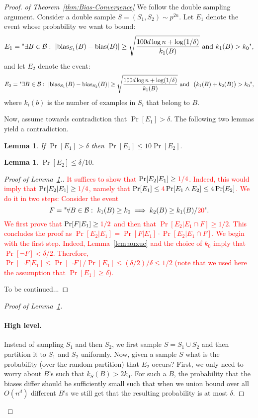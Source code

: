 \documentclass{article}
\newtheorem{lemma}[theorem]{Lemma}
\newcommand{\B}{{\cal B}}
\newcommand{\bias}{\text{bias}}
\newcommand{\samp}{S}
\newcommand{\new}[1]{\textcolor{red}{#1}}
\begin{document}
\begin{proof} {\em of Theorem~\ref{thm:Bias-Convergence}} \newline
We follow the double sampling argument.
Consider a double sample $S=(\samp_1,\samp_2)\sim p^{2n}$.
Let $E_1$ denote the event whose probability we want to bound:
\[
E_1 = \text{"}\exists {B\in\B}:~\lvert \bias_{\samp_1}(B) -
\bias(B)\rvert \geq \sqrt{\frac{100d\log n + \log(1/\delta)}{k_1(B)}}
\mbox{ and } k_1(B)>k_0
\text{"}, 
\]
and let $E_2$ denote the event:
\[
E_2 = \text{"}\exists {B\in\B}:~\lvert \bias_{\samp_1}(B) -  \bias_{\samp_2}(B)\rvert \geq \sqrt{\frac{100d\log n + \log(1/\delta)}{k_1(B)}}
  \mbox{ and }~ \bigl(k_1(B) + k_2(B)\bigr)>k_0
  \text{"},
\]
where $k_i(b)$ is the number of examples in $S_i$ that belong to $B$.

Now, assume towards contradiction that $\Pr[E_1] > \delta$.
The following two lemmas yield a contradiction.
\begin{lemma}\label{lem:aux1}
If $\Pr[E_1] > \delta$ then $\Pr[E_1]\leq 10\Pr[E_2].$
\end{lemma}
\begin{lemma}\label{lem:aux2}
$\Pr[E_2]\leq \delta/10.$
\end{lemma}

\begin{proof}[Proof of Lemma~\ref{lem:aux1}.]

\new{It suffices to show that $\Pr[E_2 \vert E_1]\geq \new{1/4}$.
Indeed, this would imply that $\Pr[E_2 \vert E_1]\geq \new{1/4}$, 
namely that $\Pr[E_1] \leq \new{4}\Pr[E_1 \land E_2]\leq 4\Pr[E_2]$.
We do it in two steps:
Consider the event
\[
F = \text{"}\forall {B\in\B}:~k_1(B) \geq k_0 \implies k_2(B) \geq k_1(B)/\new{20}
  \text{"}.
\]
We first prove that $\Pr[F \vert E_1] \geq \new{1/2}$ and then that $\Pr[E_2 \vert E_1\cap F]\geq 1/2$.
This concludes the proof as $\Pr[E_2 \vert E_1] = \Pr[F \vert E_1]\cdot\Pr[E_2 \vert E_1\cap F]$.}
\new{
We begin with the first step.
Indeed, Lemma~\ref{lem:auxuc} and the choice of $k_0$ 
imply that $\Pr[\lnot F] < \delta/2$.
Therefore, $\Pr[\lnot F \vert E_1] \leq \Pr[\lnot F]/\Pr[E_1] \leq (\delta/2)/\delta\leq 1/2$
(note that we used here the assumption that $\Pr[E_1]\geq \delta$).}

To be continued...

\end{proof}

\begin{proof}[Proof of Lemma~\ref{lem:aux2}]\ \\
\paragraph{High level.}
Instead of sampling $S_1$ and then $S_2$,
we first sample $S=S_1\cup S_2$ and 
then partition it to $S_1$ and $S_2$ uniformly.
Now, given a sample $S$ what is the probability (over the random partition)
that $E_2$ occurs?
First, we only need to worry about $B$'s such that $k_S(B) > 2k_0$.
For such a $B$, the probability that the biases differ should be sufficiently
small such that when we union bound over all $O(n^d)$ different $B$'s
we still get that the resulting probability is at most $\delta$.


\end{proof}
\end{proof}
\end{document}
